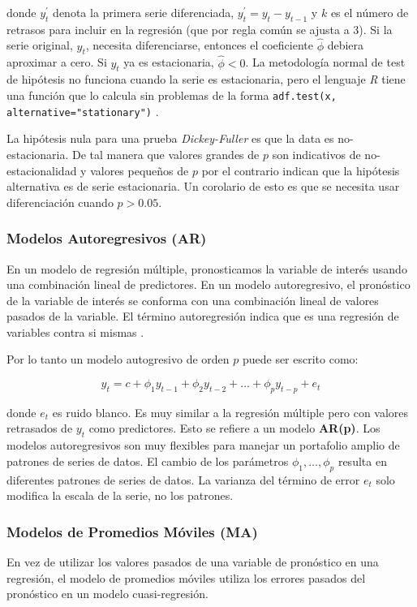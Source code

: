 donde $y_{t}^{\prime}$ denota la primera serie diferenciada, $y_{t}^{\prime} = y_{t} - y_{t-1}$ y $k$ es el número de retrasos para incluir en la regresión (que por regla común se ajusta a 3). Si la serie original, $y_{t}$, necesita diferenciarse, entonces el coeficiente $\hat{\phi}$ debiera aproximar a cero. Si $y_{t}$ ya es estacionaria, $\hat{\phi} < 0$. La metodología normal de test de hipótesis no funciona cuando la serie es estacionaria, pero el lenguaje \emph{R} tiene una función que lo calcula sin problemas de la forma \texttt{adf.test(x, alternative="stationary")} \cite{packageForecast}.

La hipótesis nula para una prueba \emph{Dickey-Fuller} es que la data es no-estacionaria. De tal manera que valores grandes de $p$ son indicativos de no-estacionalidad y valores pequeños de $p$ por el contrario indican que la hipótesis alternativa es de serie estacionaria. Un corolario de esto es que se necesita usar diferenciación cuando $p > 0.05$. 

\subsubsection{Modelos Autoregresivos (AR)}
En un modelo de regresión múltiple, pronosticamos la variable de interés usando una combinación lineal de predictores. En un modelo autoregresivo, el pronóstico de la variable de interés se conforma con una combinación lineal de valores pasados de la variable. El término autoregresión indica que es una regresión de variables contra si mismas \cite{hyndman}. 

Por lo tanto un modelo autogresivo de orden $p$ puede ser escrito como:

\[ y_{t} = c + \phi_{1}y_{t-1} + \phi_{2}y_{t-2} + \ldots + \phi_{p}y_{t-p} + e_{t}  \]

donde $e_{t}$ es ruido blanco. Es muy similar a la regresión múltiple pero con valores retrasados de $y_{t}$ como predictores. Esto se refiere a un modelo \textbf{AR(p)}. Los modelos autoregresivos son muy flexibles para manejar un portafolio amplio de patrones de series de datos. El cambio de los parámetros $\phi_1, \ldots, \phi_{p}$ resulta en diferentes patrones de series de datos. La varianza del término de error $e_t$ solo modifica la escala de la serie, no los patrones.

\subsubsection{Modelos de Promedios Móviles (MA)}
En vez de utilizar los valores pasados de una variable de pronóstico en una regresión, el modelo de promedios móviles utiliza los errores pasados del pronóstico en un modelo cuasi-regresión.


